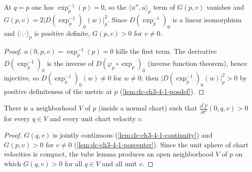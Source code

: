 \begin{lemma}[strict positivity of the second time-derivative at $q=p$]
  \label{lem:dc-ch3-4-1-poscenter}
  \leanok
  At $q=p$ one has $\exp_p^{-1}(p)=0$, so the $\langle u'',u\rangle_p$ term of $G(p,v)$
  vanishes and $G(p,v)=2\big|D(\exp_p^{-1})_0(w)\big|_p^2$. Since $D(\exp_p^{-1})_0$ is a
  linear isomorphism and $\langle\cdot,\cdot\rangle_p$ is positive definite, $G(p,v)>0$
  for $v\neq0$.
\end{lemma}
\begin{proof}
  \leanok
  $u(0,p,v)=\exp_p^{-1}(p)=0$ kills the first term. The derivative $D(\exp_p^{-1})_0$ is
  the inverse of $D(\varphi_p\circ\exp_p)_0$ (inverse function theorem), hence injective,
  so $D(\exp_p^{-1})_0(w)\neq0$ for $w\neq0$; then
  $\big|D(\exp_p^{-1})_0(w)\big|_p^2>0$ by positive definiteness of the metric at $p$
  (\cref{lem:dc-ch3-4-1-posdef}).
\end{proof}

\begin{lemma}
  \label{lem:dc-ch3-4-1-posnbhd}
  \leanok
  There is a neighborhood $V$ of $p$ (inside a normal chart) such that
  $\frac{\partial^2 F}{\partial t^2}(0,q,v)>0$ for every $q\in V$ and every unit chart
  velocity $v$.
\end{lemma}
\begin{proof}
  \leanok
  $G(q,v)$ is jointly continuous (\cref{lem:dc-ch3-4-1-continuity}) and $G(p,v)>0$ for
  $v\neq0$ (\cref{lem:dc-ch3-4-1-poscenter}). Since the unit sphere of chart velocities
  is compact, the tube lemma produces an open neighborhood $V$ of $p$ on which
  $G(q,v)>0$ for all $q\in V$ and all unit $v$.
\end{proof}

